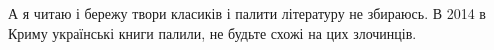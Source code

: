 \begin{itemize}
 

А я читаю і бережу твори класиків і палити літературу не збираюсь. В 2014 в
Криму українські книги палили, не будьте схожі на цих злочинців.

\end{itemize}


